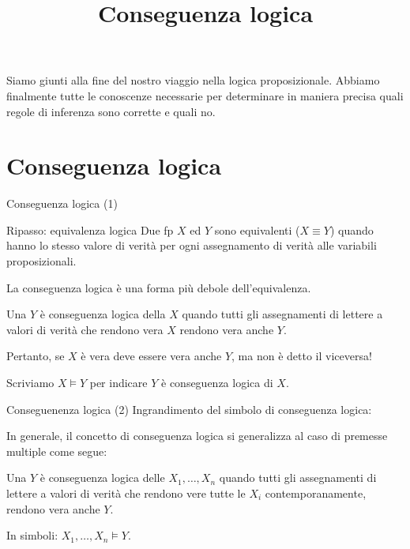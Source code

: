 \documentclass[aspectratio=169,10pt,dvipsnames,xcolor=table,handout]{beamer}
\title{Conseguenza logica}
\begin{document}
\begin{frame}
    \titlepage
\end{frame}

\begin{frame}
    Siamo giunti alla fine del nostro viaggio nella logica proposizionale. Abbiamo finalmente tutte le conoscenze necessarie per determinare in maniera precisa quali regole di inferenza sono corrette e quali no.
\end{frame}

\section{Conseguenza logica}

\begin{frame}{Conseguenza logica (1)}
    \begin{block}{Ripasso: equivalenza logica}
        Due fp $X$ ed $Y$ sono \alert{equivalenti} ($X \equiv Y$) quando hanno lo stesso valore di verità per ogni assegnamento di verità alle variabili proposizionali.
    \end{block}

    \pause
    La \alert{conseguenza logica} è una forma più debole dell'equivalenza.

    \begin{definition}
        Una \fp $Y$ è \alert{conseguenza logica} della \fp $X$ quando tutti gli assegnamenti di lettere a valori di verità che rendono vera $X$ rendono vera anche $Y$.
    \end{definition}

    \pause
    Pertanto, se $X$ è vera deve essere vera anche $Y$, ma non è detto il viceversa!

    \pause
    \begin{definition}
        Scriviamo \alert{$X \models Y$} per indicare $Y$ è conseguenza logica di $X$.
    \end{definition}
\end{frame}

\begin{frame}{Conseguenenza logica (2)}
    Ingrandimento del simbolo di conseguenza logica:

    \smallskip
    \begin{center}
        \resizebox{2cm}{!}{$\models$}
    \end{center}

    \pause
    \medskip
    In generale, il concetto di conseguenza logica si generalizza al caso di premesse multiple come segue:
    \begin{definition}
        Una \fp $Y$ è \alert{conseguenza logica} delle \fp $X_1, \ldots, X_n$ quando tutti gli assegnamenti di lettere a valori di verità che rendono vere tutte le  $X_i$ contemporanamente, rendono vera anche $Y$.

        \smallskip
        In simboli: $X_1, \ldots, X_n \models Y$.
    \end{definition}
\end{frame}
\end{document}
